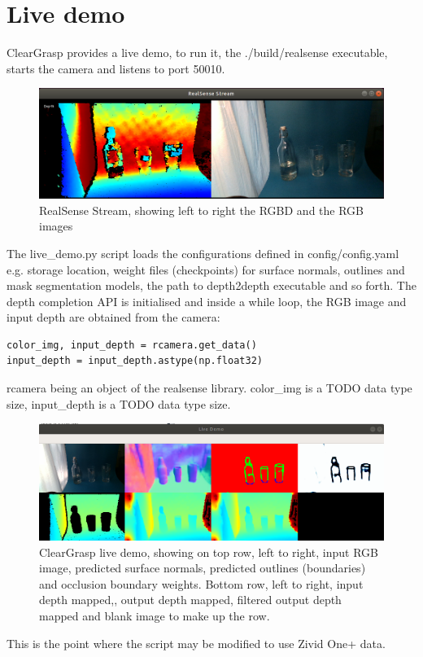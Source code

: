 \section{Live demo}
ClearGrasp provides a live demo, to run it, the ./build/realsense executable, starts the camera and listens to port 50010. 
\begin{figure}[h!]
\centering
\includegraphics[width=\textwidth]{Figures/realsenseOutputForReport.png}
\caption{RealSense Stream, showing left to right the RGBD and the RGB images}
\label{fig:realsenseOutputForReport}
\end{figure}
The live\_demo.py script loads the configurations defined in config/config.yaml e.g. storage location, weight files (checkpoints) for surface normals, outlines and mask segmentation models, the path to depth2depth executable and so forth. The depth completion API is initialised and inside a while loop, the RGB image and input depth are obtained from the camera:
\begin{verbatim}
color_img, input_depth = rcamera.get_data()
input_depth = input_depth.astype(np.float32)
\end{verbatim}
rcamera being an object of the realsense library. color\_img is a TODO data type size, input\_depth is a TODO data type size.
\begin{figure}[h!]
\centering
\includegraphics[width=\textwidth]{Figures/ClearGraspLiveDemoForReport.png}
\caption{ClearGrasp live demo, showing on top row, left to right, input RGB image, predicted surface normals, predicted outlines (boundaries) and occlusion boundary weights. Bottom row, left to right, input depth mapped,, output depth mapped, filtered output depth mapped and blank image to make up the row.}
\label{fig:ClearGraspLiveDemoForReport}
\end{figure}

This is the point where the script may be modified to use Zivid One+ data.







